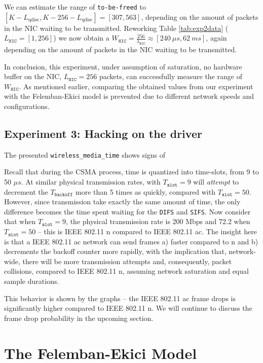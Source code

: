 We can estimate the range of \texttt{to-be-freed} to $[K - L_\text{qdisc}, K -
256 - L_\text{qdisc}] = [307, 563]$, depending on the amount of packets in the
NIC waiting to be transmitted. Reworking Table \ref{tab:exp2data}
($L_\texttt{NIC} = [1, 256]$) we now obtain a $W_\texttt{NIC} =
\frac{256}{\lambda_\texttt{NIC}} \approx [240~\mu s, 62~ms]$, again depending
on the amount of packets in the NIC waiting to be transmitted.

In conclusion, this experiment, under assumption of saturation, no hardware
buffer on the NIC, $L_\texttt{NIC} = 256$ packets, can successfully measure
the range of $W_\texttt{NIC}$. As mentioned earlier, comparing the obtained
values from our experiment with the Felemban-Ekici model is prevented due to
different network speeds and configurations.

\subsection{Experiment 3: Hacking on the driver}

The presented \texttt{wireless\_media\_time} shows signs of


Recall that during the CSMA process, time is quantized into time-slots, from 9
to 50 $\mu s$. At similar physical transmission rates, with $T_{\texttt{slot}}
= 9$ will \emph{attempt} to decrement the $T_{\texttt{backoff}}$ more than 5
times as quickly, compared with $T_\texttt{slot} = 50$. However, since
transmission take exactly the same amount of time, the only difference becomes
the time spent waiting for the \texttt{DIFS} and \texttt{SIFS}. Now consider
that when $T_{\texttt{slot}} = 9$, the physical transmission rate is 200 Mbps
and 72.2 when $T_{\texttt{slot}} = 50$ -- this is IEEE 802.11 n compared to
IEEE 802.11 ac. The insight here is that a IEEE 802.11 ac network can send
frames a) faster compared to n and b) decrements the backoff counter more
rapidly, with the implication that, network-wide, there will be more
transmission attempts and, consequently, packet collisions, compared to
IEEE 802.11 n, assuming network saturation and equal sample durations.

This behavior is shown by the graphs -- the IEEE 802.11 ac frame drops is
significantly higher compared to IEEE 802.11 n. We will continue to discuss
the frame drop probability in the upcoming section.

\section{The Felemban-Ekici Model}

